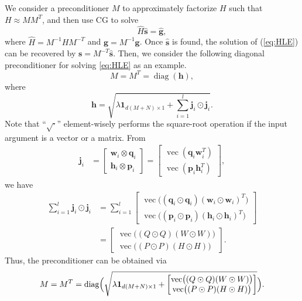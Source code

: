 \documentclass[11pt,twoside]{article}
\newcommand{\bsym}[1]{\ensuremath{\boldsymbol{#1}}}
\newcommand{\bw}{\ensuremath{\bsym{w}}}
\newcommand{\bj}{\ensuremath{\bsym{j}}}
\newcommand{\bp}{\ensuremath{\bsym{p}}}
\newcommand{\bq}{\ensuremath{\bsym{q}}}
\newcommand{\bh}{\ensuremath{\bsym{h}}}
\newcommand{\bs}{\ensuremath{\bsym{s}}}
\newcommand{\bg}{\ensuremath{\bsym{g}}}
\DeclareMathOperator*{\diag}{diag}
\DeclareMathOperator*{\vectorize}{vec}
\begin{document}
We consider a preconditioner $M$ to approximately factorize $H$ such that $H \approx {M}{M}^T$, and then use CG to solve
\begin{equation}
    \hat{H} \hat{\bs}  = \hat{\bg},
    \label{eq:PcondSys}
\end{equation}
where $\hat{H}={M}^{-1}{H}{M}^{-T}$ and $\hat{\bg}={M}^{-1}{\bg}$.
Once $\hat{\bs}$ is found, the solution of (\ref{eq:HLE}) can be recovered by ${\bs}={M}^{-T}\hat{\bs}$. 
Then, we consider the following diagonal preconditioner for solving \eqref{eq:HLE} as an example.
\begin{equation}
    {M}={M}^T=\diag({\bsym{h}}),
    \label{eq:Conder}
\end{equation}
where
\begin{equation*}
    {\bsym{h}} = \sqrt{ {\lambda} \bsym{1}_{d(M+N) \times 1} + \sum_{i=1}^l {\bj_i} \odot {\bj_i} }.
\end{equation*}
Note that ``$\sqrt{\cdot}$'' element-wisely performs the square-root operation if the input argument is a vector or a matrix. From 
\begin {align}
\bj_i &= \begin{bmatrix} \bw_i\otimes \bq_i \\ \bh_i\otimes \bp_i \end{bmatrix} = \begin{bmatrix} \vectorize(\bq_i \bw_i^T) \\ \vectorize(\bp_i \bh_i^T) \end{bmatrix}
\label{eq:Jacob_},
\end{align}
we have
\begin{align}
\sum_{i=1}^l {\bj_i} \odot {\bj_i}
&= \sum_{i=1}^l \begin{bmatrix} \vectorize \bigl((\bq_i \odot \bq_i) (\bw_i \odot \bw_i)^T \bigr) \\ \vectorize \bigl((\bp_i \odot \bp_i) (\bh_i \odot \bh_i)^T \bigr) \end{bmatrix} \nonumber  \\
&= \begin{bmatrix} \vectorize \bigl((Q \odot Q) (W \odot W) \bigr) \\ \vectorize \bigl((P \odot P) (H \odot H) \bigr) \end{bmatrix}
\label{eq:jj}.
\end{align}
Thus, the preconditioner can be obtained via
\begin{equation}
    {M}={M}^T=\diag \Bigl( \sqrt{ {\lambda} \bsym{1}_{d(M+N) \times 1} + \begin{bmatrix} \vectorize \bigl((Q \odot Q) (W \odot W) \bigr) \\ \vectorize \bigl((P \odot P) (H \odot H) \bigr) \end{bmatrix} } \Bigr).
    \label{eq:Conder}
\end{equation}
\end{document}
